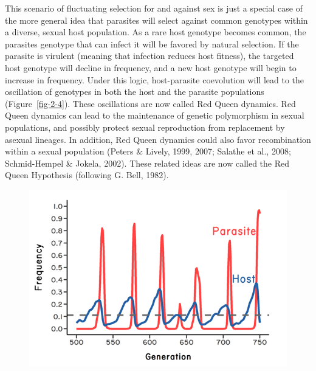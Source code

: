 \documentclass[
  letterpaper,
]{book}
\begin{document}
This scenario of fluctuating selection for and against sex is just a
special case of the more general idea that parasites will select against
common genotypes within a diverse, sexual host population. As a rare
host genotype becomes common, the parasites genotype that can infect it
will be favored by natural selection. If the parasite is virulent
(meaning that infection reduces host fitness), the targeted host
genotype will decline in frequency, and a new host genotype will begin
to increase in frequency. Under this logic, host-parasite coevolution
will lead to the oscillation of genotypes in both the host and the
parasite populations (Figure~\ref{fig-2-4}). These oscillations are now
called Red Queen dynamics. Red Queen dynamics can lead to the
maintenance of genetic polymorphism in sexual populations, and possibly
protect sexual reproduction from replacement by asexual lineages. In
addition, Red Queen dynamics could also favor recombination within a
sexual population (Peters \& Lively, 1999, 2007; Salathe et al., 2008;
Schmid-Hempel \& Jokela, 2002). These related ideas are now called the
Red Queen Hypothesis (following G. Bell, 1982).

\begin{figure}


{\centering \includegraphics{images/fig2-4.jpeg}

}

\end{figure}
\end{document}
